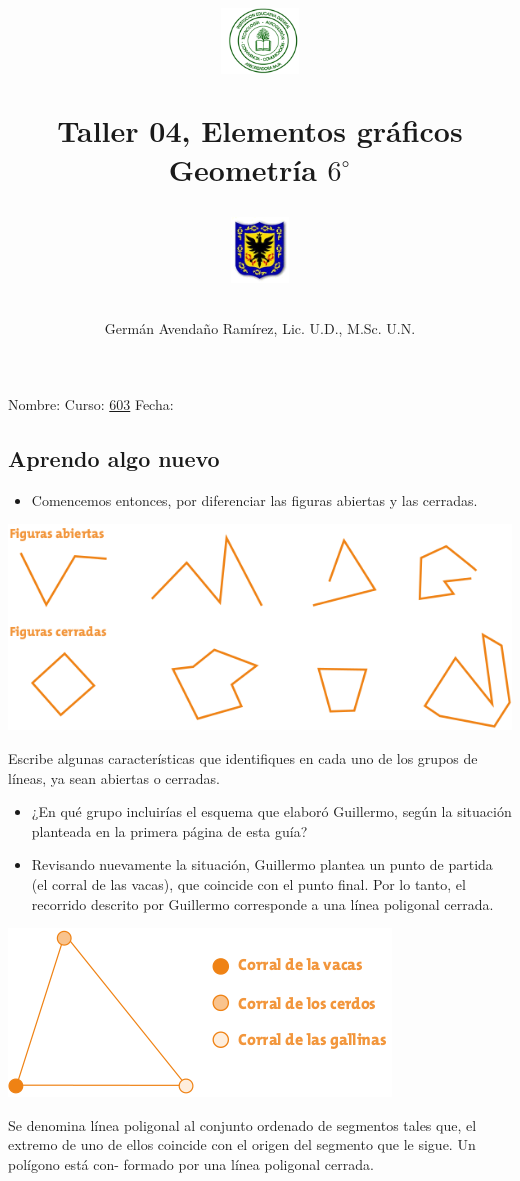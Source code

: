 \documentclass[letterpaper,11pt,twoside]{article}
\author{Germ\'an Avenda\~no Ram\'irez, Lic. U.D., M.Sc. U.N.}
\title{\begin{minipage}{.2\textwidth}
\includegraphics[height=1.75cm]{Images/logo-colegio.png}\end{minipage}
\begin{minipage}{.55\textwidth}
\begin{center}
Taller 04, Elementos gráficos\\
Geometría $6^{\circ}$
\end{center}
\end{minipage}\hfill
\begin{minipage}{.2\textwidth}
\includegraphics[height=1.75cm]{Images/logo-sed.png} 
\end{minipage}}
\date{}
\begin{document}
\maketitle
Nombre: \hrulefill Curso: \underline{603} Fecha: \underline{\hspace*{2.5cm}}
\begin{multicols}{2}
\section*{Aprendo algo nuevo}
\begin{itemize}
\item Comencemos entonces, por diferenciar las figuras
abiertas y las cerradas.
\end{itemize}
\begin{center}
\includegraphics[scale=.4]{Images/Fig_abiertas_cerradas.png} 
\end{center}
Escribe algunas características que identifiques en cada uno
de los grupos de líneas, ya sean abiertas o cerradas.
\begin{itemize}
\item ¿En qué grupo incluirías el esquema que elaboró
Guillermo, según la situación planteada en la primera
página de esta guía?
\item Revisando nuevamente la situación, Guillermo plantea
un punto de partida (el corral de las vacas), que coincide
con el punto final. Por lo tanto, el recorrido descrito por
Guillermo corresponde a una línea poligonal cerrada.
\end{itemize}
\begin{center}
\includegraphics[scale=.55]{Images/corrales.png}
\end{center}
Se denomina línea poligonal al conjunto ordenado de segmentos tales que, el extremo de uno de ellos coincide con
el origen del segmento que le sigue. Un polígono está con-
formado por una línea poligonal cerrada.


\end{multicols}
\end{document}
